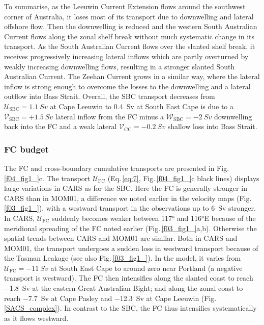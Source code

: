 \documentclass[preprint,3p,review,12pt]{elsarticle}
\newcommand{\sub}[1]{_{\text{#1}}}
\begin{document}
To summarise, as the Leeuwin Current Extension flows around the southwest corner of Australia, it loses most of its transport due to downwelling
 and lateral offshore flow.
Then the downwelling is reduced and the western South Australian Current flows along the zonal shelf break without much systematic change in its transport.
As the South Australian Current flows over the slanted shelf break, it receives progressively increasing lateral inflows which are partly overturned by weakly increasing downwelling flows, resulting in a stronger slanted South Australian Current\@.
The Zeehan Current grows
in a similar way,
where the lateral inflow is
strong enough to overcome the losses to the downwelling and a lateral outflow into
Bass Strait. Overall, the SBC transport decreases from $\mathcal{U}\sub{SBC} = \SI{1.1}{Sv}$
at Cape Leeuwin to \SI{0.4}{Sv} at South East Cape is due to a $\mathcal{V}\sub{SBC} = +\SI{1.5}{Sv}$ lateral inflow from the FC minus
a $\mathcal{W}\sub{SBC} = \SI{-2}{Sv}$ downwelling 
back into the FC and a weak lateral $\mathcal{V}\sub{CC} = \SI{-0.2}{Sv}$ shallow loss into Bass Strait.

\subsubsection{FC budget}\label{FC budget}
The FC and cross-boundary cumulative transports are presented in Fig.\,\ref{f04_fig1_}c.
The transport $\mathcal{U}\sub{FC}$ (Eq.\,\ref{eq:7}, Fig.\,\ref{f04_fig1_}c black lines) displays large variations in CARS
as for the SBC\@.
Here the FC is generally stronger in CARS than in MOM01, a difference we noted earlier in the velocity maps (Fig.\,\ref{f03_fig1_}), with a westward transport in the observations up to \SI{6}{Sv} stronger.
In CARS, $\mathcal{U}\sub{FC}$ suddenly becomes
weaker between \ang{117} and \ang{116}E
because of the meridional spreading of the FC noted earlier (Fig.\,\ref{f03_fig1_}a,b).
Otherwise the spatial trends between CARS
and MOM01 are similar.
Both in CARS and MOM01,
the transport undergoes
a sudden loss in westward transport
because of the Tasman Leakage
(see also Fig.\,\ref{f03_fig1_}).
In the model, it varies from $\mathcal{U}\sub{FC} = \SI{-11}{Sv}$
at South East Cape to around zero near Portland (a negative transport is westward). The FC then intensifies along the slanted coast to reach \SI{-1.8}{Sv} at the eastern Great Australian Bight; and along the zonal coast to reach \SI{-7.7}{Sv} at Cape Pasley and \SI{-12.3}{Sv} at Cape Leeuwin (Fig.\,\ref{SACS_complex}). In contrast to the SBC,
the FC thus intensifies systematically as it flows westward.
\end{document}
